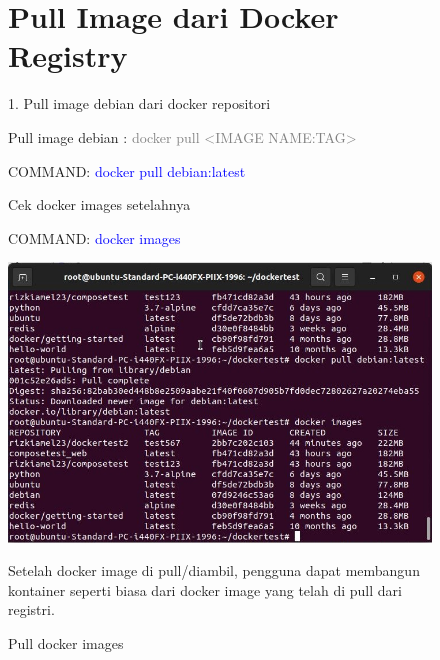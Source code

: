 \begin{figure}
\section{Pull Image dari Docker Registry}

1. Pull image debian dari docker repositori

Pull image debian : \textcolor{Gray}{docker pull <IMAGE NAME:TAG>}

COMMAND: \textcolor{Blue}{docker pull debian:latest}

Cek docker images setelahnya 

COMMAND: \textcolor{Blue}{docker images}
    \begin{center}
        \includegraphics[width=\linewidth]{image/35.jpg}
        \caption{Pull docker images}
        \label{fig:my_figure}
    \end{center}

Setelah docker image di pull/diambil, pengguna dapat membangun kontainer seperti biasa dari 
docker image yang telah di pull dari registri.

\end{figure}



